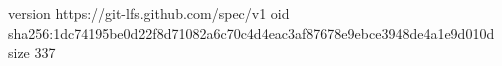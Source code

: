 version https://git-lfs.github.com/spec/v1
oid sha256:1dc74195be0d22f8d71082a6c70c4d4eac3af87678e9ebce3948de4a1e9d010d
size 337

